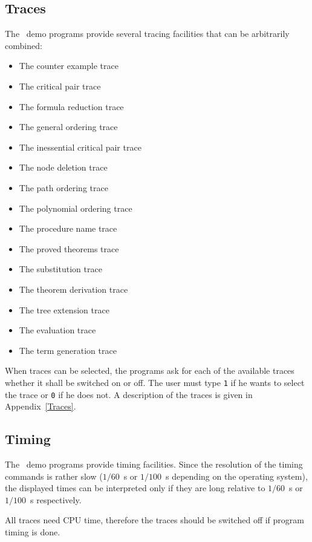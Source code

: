 \subsection{Traces}
The \redux\  demo programs provide several tracing facilities that can be
arbitrarily combined:
\begin{itemize}
\item The counter example trace
\item The critical pair trace
\item The formula reduction trace
\item The general ordering trace
\item The inessential critical pair trace
\item The node deletion trace
\item The path ordering trace
\item The polynomial ordering trace
\item The procedure name trace
\item The proved theorems trace
\item The substitution trace
\item The theorem derivation trace
\item The tree extension trace
\item The evaluation trace
\item The term generation trace
\end{itemize}

When traces can be selected, the programs ask for each of the available
traces whether it shall be switched on or off.
The user must type {\tt 1} if he wants to select the trace or {\tt 0} if
he does not.
A description of the traces is given in Appendix~\ref{Traces}.

\subsection{Timing}
The \redux\  demo programs provide timing facilities. Since the resolution
of the timing commands is rather slow ($1/60$~s or $1/100$~s depending on
the operating system), the displayed times
can be interpreted only if they are long relative to 
$1/60$~s or $1/100$~s respectively.

All traces need CPU time, therefore the traces should be switched off if
program timing is done.
